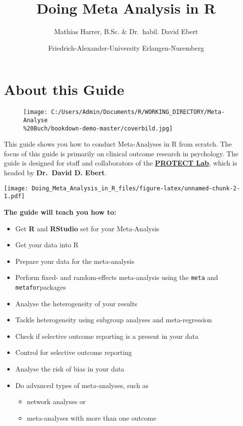 \documentclass[]{book}
\title{Doing Meta Analysis in R}
\author{Mathias Harrer, B.Sc. \& Dr.~habil. David Ebert}
\date{Friedrich-Alexander-University Erlangen-Nuremberg}
\providecommand{\tightlist}{%
  \setlength{\itemsep}{0pt}\setlength{\parskip}{0pt}}
\theoremstyle{definition}
\theoremstyle{definition}
\theoremstyle{definition}
\theoremstyle{remark}
\begin{document}
\maketitle

{
\setcounter{tocdepth}{1}
\tableofcontents
}
\chapter{About this Guide}\label{about-this-guide}

\begin{figure}
\centering
\texttt{[image: C:/Users/Admin/Documents/R/WORKING\_DIRECTORY/Meta-Analyse\\\%20Buch/bookdown-demo-master/coverbild.jpg]}
\caption{}
\end{figure}

\begin{rmdinfo}
This guide shows you how to conduct Meta-Analyses in R from scratch. The
focus of this guide is primarily on clinical outcome research in
psychology. The guide is designed for staff and collaborators of the
\href{https://www.protectlab.org}{\textbf{PROTECT Lab}}, which is headed
by \textbf{Dr.~David D. Ebert}.
\end{rmdinfo}

\texttt{[image: Doing\_Meta\_Analysis\_in\_R\_files/figure-latex/unnamed-chunk-2-1.pdf]}

\textbf{The guide will teach you how to:}

\begin{itemize}
\tightlist
\item
  Get \textbf{R} and \textbf{RStudio} set for your Meta-Analysis
\item
  Get your data into R
\item
  Prepare your data for the meta-analysis
\item
  Perform fixed- and random-effects meta-analysis using the
  \texttt{meta} and \texttt{metafor}packages
\item
  Analyse the heterogeneity of your results
\item
  Tackle heterogeneity using subgroup analyses and meta-regression
\item
  Check if selective outcome reporting is a present in your data
\item
  Control for selective outcome reporting
\item
  Analyse the risk of bias in your data
\item
  Do advanced types of meta-analyses, such as

  \begin{itemize}
  \tightlist
  \item
    network analyses or
  \item
    meta-analyses with more than one outcome
  \end{itemize}
\end{itemize}
\end{document}
